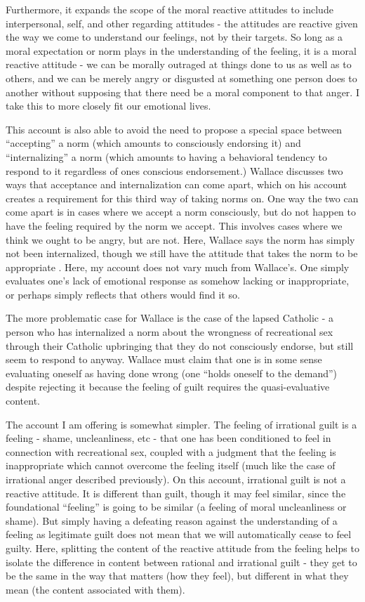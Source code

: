 \documentclass[phd,12pt,oneside,paper=letterpaper]{ubcthesis}
\begin{document}
Furthermore, it expands the scope of the moral reactive attitudes to include interpersonal, self, and other regarding attitudes - the attitudes are reactive given the way we come to understand our feelings, not by their targets. So long as a moral expectation or norm plays in the understanding of the feeling, it is a moral reactive attitude - we can be morally outraged at things done to us as well as to others, and we can be merely angry or disgusted at something one person does to another without supposing that there need be a moral component to that anger. I take this to more closely fit our emotional lives. 

This account is also able to avoid the need to propose a special space between ``accepting'' a norm (which amounts to consciously endorsing it) and ``internalizing'' a norm (which amounts to having a behavioral tendency to respond to it regardless of ones conscious endorsement.) Wallace discusses two ways that acceptance and internalization can come apart, which on his account creates a requirement for this third way of taking norms on. One way the two can come apart is in cases where we accept a norm consciously, but do not happen to have the feeling required by the norm we accept. This involves cases where we think we ought to be angry, but are not. Here, Wallace says the norm has simply not been internalized, though we still have the attitude that takes the norm to be appropriate \citep[p.41-5]{wallace1994}. Here, my account does not vary much from Wallace's. One simply evaluates one's lack of emotional response as somehow lacking or inappropriate, or perhaps simply reflects that others would find it so.

The more problematic case for Wallace is the case of the lapsed Catholic - a person who has internalized a norm about the wrongness of recreational sex through their Catholic upbringing that they do not consciously endorse, but still seem to respond to anyway. Wallace must claim that one is in some sense evaluating oneself as having done wrong (one ``holds oneself to the demand'') despite rejecting it because the feeling of guilt requires the quasi-evaluative content. 

The account I am offering is somewhat simpler. The feeling of irrational guilt is a feeling - shame, uncleanliness, etc - that one has been conditioned to feel in connection with recreational sex, coupled with a judgment that the feeling is inappropriate which cannot overcome the feeling itself (much like the case of irrational anger described previously). On this account, irrational guilt is not a reactive attitude. It is different than guilt, though it may feel similar, since the foundational ``feeling'' is going to be similar (a feeling of moral uncleanliness or shame). But simply having a defeating reason against the understanding of a feeling as legitimate guilt does not mean that we will automatically cease to feel guilty. Here, splitting the content of the reactive attitude from the feeling helps to isolate the difference in content between rational and irrational guilt - they get to be the same in the way that matters (how they feel), but different in what they mean (the content associated with them). 
\end{document}
